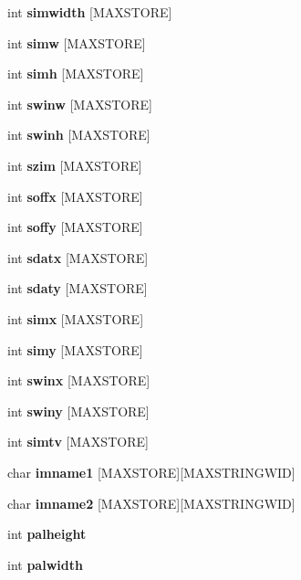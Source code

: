 \begin{CompactItemize}
\item 
int {\bf simwidth} [MAXSTORE]\label{xtvutils_8c_a99}

\item 
int {\bf simw} [MAXSTORE]\label{xtvutils_8c_a100}

\item 
int {\bf simh} [MAXSTORE]\label{xtvutils_8c_a101}

\item 
int {\bf swinw} [MAXSTORE]\label{xtvutils_8c_a102}

\item 
int {\bf swinh} [MAXSTORE]\label{xtvutils_8c_a103}

\item 
int {\bf szim} [MAXSTORE]\label{xtvutils_8c_a104}

\item 
int {\bf soffx} [MAXSTORE]\label{xtvutils_8c_a105}

\item 
int {\bf soffy} [MAXSTORE]\label{xtvutils_8c_a106}

\item 
int {\bf sdatx} [MAXSTORE]\label{xtvutils_8c_a107}

\item 
int {\bf sdaty} [MAXSTORE]\label{xtvutils_8c_a108}

\item 
int {\bf simx} [MAXSTORE]\label{xtvutils_8c_a109}

\item 
int {\bf simy} [MAXSTORE]\label{xtvutils_8c_a110}

\item 
int {\bf swinx} [MAXSTORE]\label{xtvutils_8c_a111}

\item 
int {\bf swiny} [MAXSTORE]\label{xtvutils_8c_a112}

\item 
int {\bf simtv} [MAXSTORE]\label{xtvutils_8c_a113}

\item 
char {\bf imname1} [MAXSTORE][MAXSTRINGWID]\label{xtvutils_8c_a114}

\item 
char {\bf imname2} [MAXSTORE][MAXSTRINGWID]\label{xtvutils_8c_a115}

\item 
int {\bf palheight}\label{xtvutils_8c_a116}

\item 
int {\bf palwidth}\label{xtvutils_8c_a117}


\end{CompactItemize}
